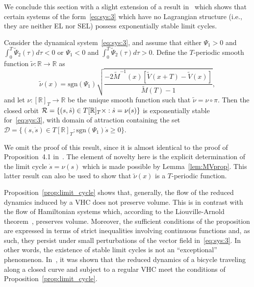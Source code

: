 We conclude this section with a slight extension of a result
in~\cite[Proposition 4.1]{Consolini-2012} which shows that certain
systems of the form~\eqref{eq:sys:3} which have no Lagrangian structure
(i.e., they are neither EL nor SEL) possess exponentially stable limit
cycles.
\begin{proposition}\label{prop:limit_cycle}
	Consider the dynamical system~\eqref{eq:sys:3}, and assume that either
	$\Psi_1>0$ and $\int_0^T \tilde \Psi_2(\tau) d \tau<0$ or $\Psi_1<0$
	and $\int_0^T \tilde \Psi_2(\tau) d \tau>0$. Define the $T$-periodic
	smooth function $\tilde \nu:\mathbb{R} \to \mathbb{R}$ as
	\[
	\tilde{\nu}(x)=\mbox{sgn}({\Psi}_1)\sqrt{\frac{-2\tilde{M}^{-1}(x)[\tilde{V}(x+T)-\tilde{V}(x)]}{\tilde{M}(T)-1}},
	\]
	and let $\nu: [\mathbb{R}]_T \to \mathbb{R}$ be the unique smooth function such that
	$\tilde \nu = \nu \circ \pi$.  Then the closed orbit ${\cal R} =
	\{(s,\dot{s})\in T[\mathbb{R}]_T\times: \dot{s}=\nu(s)\}$ is exponentially stable
	for~\eqref{eq:sys:3}, with domain of attraction containing the set
	$\mathcal{D}=\{(s,\dot{s})\in T[\mathbb{R}]_T: \mbox{sgn}(\Psi_1)\dot{s}\geq
	0\}$.
\end{proposition}

We omit the proof of this result, since it is almost identical to the
proof of Proposition~4.1 in~\cite{Consolini-2012}. The element of
novelty here is the explicit determination of the limit cycle $\dot s
= \nu(s)$ which is made possible by Lemma~\ref{lem:MVprop}. This latter
result can also be used to show that $\tilde \nu(x)$ is a $T$-periodic
function.

\begin{remark}
	Proposition~\ref{prop:limit_cycle} shows that, generally, the flow of
	the reduced dynamics induced by a VHC does not preserve volume. This
	is in contrast with the flow of Hamiltonian systems which, according
	to the Liouville-Arnold theorem~\cite{ArnoldClassicalMech}, preserves
	volume. Moreover, the sufficient conditions of the proposition are
	expressed in terms of strict inequalities involving continuous
	functions and, as such, they persist under small perturbations of the
	vector field in~\eqref{eq:sys:3}. In other words, the existence of
	stable limit cycles is not an ``exceptional''
	phenomenon. In~\cite{Consolini-2012}, it was shown that the reduced
	dynamics of a bicycle traveling along a closed curve and subject to a
	regular VHC meet the conditions of Proposition~\ref{prop:limit_cycle}.
\end{remark}

